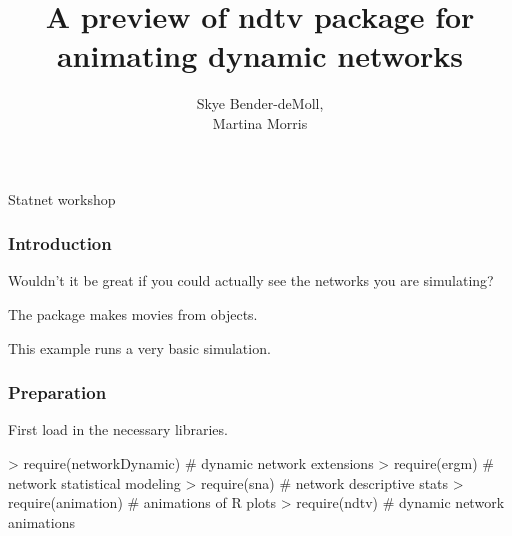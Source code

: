 \documentclass{beamer}
\begin{document}
\renewenvironment{Schunk}{}{}
\begin{frame}


\title{A preview of ndtv package for animating dynamic networks}  
\author{Skye Bender-deMoll,\\ Martina Morris}
\maketitle

Statnet workshop
\end{frame}

\begin{frame}[fragile]
\frametitle{Introduction}
Wouldn't it be great if you could actually see the networks you are simulating?

The \verb@ndtv@ package makes movies from \verb@networkDynamic@ objects.

This example runs a very basic \verb@stergm@ simulation.

\end{frame}


\begin{frame}[fragile]
\frametitle{Preparation}


First load in the necessary libraries. 

\begin{Schunk}
\begin{Sinput}
> require(networkDynamic)   # dynamic network extensions
> require(ergm)             # network statistical modeling
> require(sna)              # network descriptive stats
> require(animation)        # animations of R plots
> require(ndtv)             # dynamic network animations
\end{Sinput}
\end{Schunk}

\end{frame}
\end{document}
